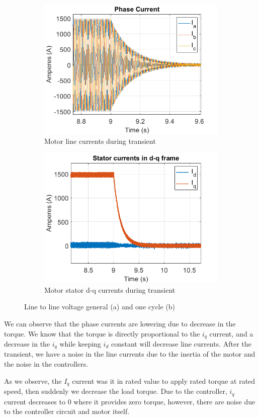         \begin{figure}[H]
        \centering
        \begin{subfigure}[b]{0.475\textwidth}
              \centering
        \includegraphics[width = 8 cm]{figs/sv_tl0_abc.png}
        \caption{Motor line currents during transient}
        \label{fig:sv_tl0_p}
        \end{subfigure}
        \hfill
        \begin{subfigure}[b]{0.475\textwidth}  
            \centering
        \includegraphics[width = 8 cm]{figs/sv_tl0_dq.png}
        \caption{Motor stator d-q currents during transient}
        \label{fig:sv_tl0_dq}
        \end{subfigure}
        \caption{Line to line voltage general (a) and one cycle (b)}
        \label{fig:sv_3phase_c}
        \end{figure}
        
We can observe that the phase currents are lowering due to decrease in the torque. We know that the torque is directly proportional to the $i_q$ current, and a decrease in the $i_q$ while keeping $i_d$ constant will decrease line currents. After the transient, we have a noise in the line currents due to the inertia of the motor and the noise in the controllers.
        
As we observe, the $I_q$ current was it in rated value to apply rated torque at rated speed, then suddenly we decrease the load torque. Due to the controller, $i_q$ current decreases to $0$ where it provides zero torque, however, there are noise due to the controller circuit and motor itself.

